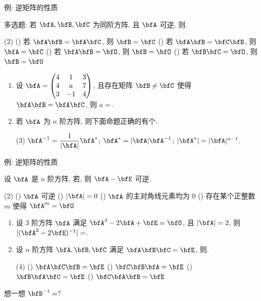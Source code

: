 \begin{frame}{例: 逆矩阵的性质}
	\onslide<+->
	\begin{example}
		多选题: 若 $\bfA,\bfB,\bfC$ 为同阶方阵, 且 $\bfA$ 可逆, 则.
		\begin{exchoice}(2)
			() 若 $\bfA\bfB=\bfA\bfC$, 则 $\bfB=\bfC$
			() 若 $\bfA\bfB=\bfC\bfB$, 则 $\bfA=\bfC$
			() 若 $\bfA\bfB=\bfO$, 则 $\bfB=\bfO$
			() 若 $\bfB\bfC=\bfO$, 则 $\bfB=\bfO$
		\end{exchoice}
	\end{example}
	\onslide<+->
	\begin{exercise}
		\begin{enumerate}
			\item 设 $\bfA=\begin{pmatrix}
				4&1&3\\4&a&7\\3&-1&4
			\end{pmatrix}$, 且存在矩阵 $\bfB\neq\bfC$ 使得 $\bfA\bfB=\bfA\bfC$, 则 $a=$\fillblankframe{$-3$}.
			\item 若 $\bfA$ 为 $n$ 阶方阵, 则下面命题正确的有\fillblankframe{$1$}个.
			\begin{tasks}[label={(\roman*)},label-format=\upshape\textcolor{main}](3)
				\task $\bfA^{-1}=\dfrac1{|\bfA|}\bfA^*$;
				\task $\bfA^*=|\bfA|\bfA^{-1}$;
				\task $|\bfA^*|=|\bfA|^{n-1}$.
			\end{tasks}
		\end{enumerate}
	\end{exercise}
\end{frame}


\begin{frame}{例: 逆矩阵的性质}
	\onslide<+->
	\begin{example}
		设 $\bfA$ 是 $n$ 阶方阵, 若, 则 $\bfA-\bfE$ 可逆.
		\begin{exchoice}(2)
			() $\bfA$ 可逆
			() $|\bfA|=0$
			() $\bfA$ 的主对角线元素均为 $0$
			() 存在某个正整数 $m$ 使得 $\bfA^m=\bfO$
		\end{exchoice}
	\end{example}
	\onslide<+->
	\begin{exercise}
		\begin{enumerate}
			\item 设 $3$ 阶方阵 $\bfA$ 满足 $\bfA^3-2\bfA+\bfE=\bfO$, 且 $|\bfA|=2$, 则 $|(\bfA^2-2\bfE)^{-1}|=$\fillblankframe{$-2$}.
			\item 设 $n$ 阶方阵 $\bfA,\bfB,\bfC$ 满足 $\bfA\bfB\bfC=\bfE$, 则\fillbraceframe{D}.
			\begin{exchoice}(4)
				() $\bfA\bfC\bfB=\bfE$
				() $\bfC\bfB\bfA=\bfE$
				() $\bfB\bfA\bfC=\bfE$
				() $\bfC\bfA\bfB=\bfE$
			\end{exchoice}
		\end{enumerate}
	\end{exercise}
	\onslide<+->
	想一想 $\bfB^{-1}=?$
\end{frame}



